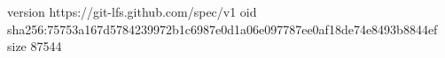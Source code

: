 version https://git-lfs.github.com/spec/v1
oid sha256:75753a167d5784239972b1c6987e0d1a06e097787ee0af18de74e8493b8844ef
size 87544
